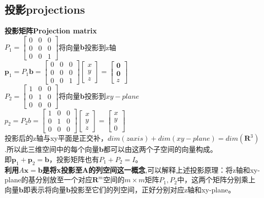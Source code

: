 \documentclass[UTF8]{article}
\begin{document}
    \subsection{投影projections}
    \textbf{投影矩阵Projection matrix}\\
    $P_{1}=\left[\begin{array}{lll}{0} & {0} & {0} \\ {0} & {0} & {0} \\ {0} & {0} & {1}\end{array}\right]$\quad 将向量$\bm{b}$投影到z轴
    \\
    $\boldsymbol{p}_{1}=P_{1} \boldsymbol{b}=\left[\begin{array}{ccc}{0} & {0} & {0} \\ {0} & {0} & {0} \\ {0} & {0} & {1}\end{array}\right]\left[\begin{array}{l}{x} \\ {y} \\ {z}\end{array}\right]=\left[\begin{array}{l}{\mathbf{0}} \\ {\mathbf{0}} \\ {z}\end{array}\right]$
    \\
    $P_{2}=\left[\begin{array}{lll}{1} & {0} & {0} \\ {0} & {1} & {0} \\ {0} & {0} & {0}\end{array}\right]$\quad 将向量$\bm{b}$投影到$xy-plane$
    \\
    $p_{2}=P_{2} b=\left[\begin{array}{lll}{1} & {0} & {0} \\ {0} & {1} & {0} \\ {0} & {0} & {0}\end{array}\right]\left[\begin{array}{l}{x} \\ {y} \\ {z}\end{array}\right]=\left[\begin{array}{l}{x} \\ {y} \\ {0}\end{array}\right]$
    \\
    投影后的z轴与xy平面是正交补，$dim(z axis) + dim(xy-plane) = dim(\bm{R}^3)$.所以此三维空间中的每个向量$\bm{b}$都可以由这两个子空间的向量构成。
    \\
    即$\boldsymbol{p}_{1}+\boldsymbol{p}_{2}=\boldsymbol{b}$，投影矩阵也有$P_{1}+P_{2}=I$。
    \\
    \textbf{利用$A\bm{x}=\bm{b}$是将x投影至A的列空间这一概念},可以解释上述投影原理：将z轴和xy-plane的基分别放至一个对应$\bm{R}^m$空间的$m\times m$矩阵$P_1,P_2$中，这两个矩阵分别乘上向量$\bm{b}$即表示将向量$\bm{b}$投影至它们的列空间，正好分别对应z轴和xy-plane。
\end{document}
